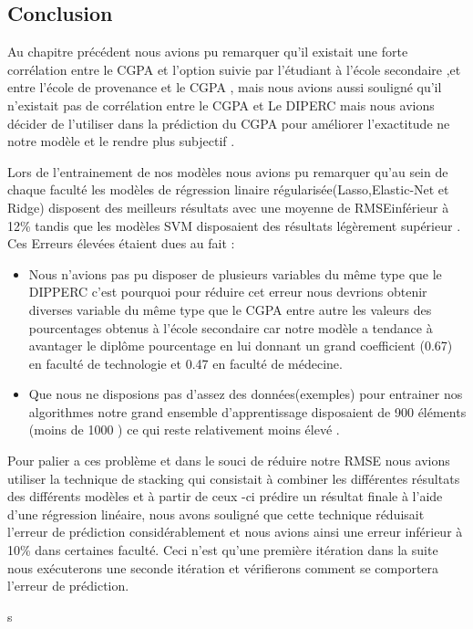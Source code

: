 \subsection{Conclusion}
Au chapitre précédent nous avions pu remarquer qu'il existait une forte corrélation entre le CGPA et l'option suivie par l'étudiant à l'école secondaire ,et entre l'école de provenance et le CGPA , mais nous avions aussi souligné qu'il n'existait pas de corrélation entre le CGPA et Le DIPERC mais nous avions décider de l'utiliser dans la prédiction du CGPA pour améliorer l'exactitude ne notre modèle et le rendre plus subjectif  .

Lors de l'entrainement de nos modèles nous avions pu remarquer qu'au sein de chaque faculté les modèles de régression linaire régularisée(Lasso,Elastic-Net et Ridge) disposent des meilleurs résultats avec une moyenne de \ac{RMSE}inférieur à 12\% tandis que les modèles SVM disposaient des résultats légèrement supérieur .
Ces Erreurs élevées étaient dues au fait :

\begin{itemize}
	\item Nous n'avions pas pu disposer de plusieurs variables du même type que le DIPPERC  c'est pourquoi pour réduire cet erreur nous devrions obtenir diverses variable du même type que le CGPA entre autre les valeurs des pourcentages obtenus à l'école secondaire car notre modèle a tendance à avantager le diplôme pourcentage en lui donnant un grand coefficient (0.67) en faculté de technologie et 0.47 en faculté de médecine. 
	\item Que nous ne disposions pas d'assez des données(exemples) pour entrainer nos algorithmes notre grand ensemble d'apprentissage disposaient de 900 éléments (moins de 1000 ) ce qui reste relativement  moins élevé   .
\end{itemize}

Pour palier a ces problème et dans le souci de réduire notre \ac{RMSE} nous avions utiliser la technique de stacking qui consistait à combiner les différentes résultats des différents modèles et à partir de ceux -ci prédire un résultat finale à l'aide d'une régression linéaire, nous avons souligné que cette technique réduisait l'erreur de prédiction considérablement et nous avions ainsi une erreur inférieur à 10\% dans certaines faculté.
Ceci n'est qu'une première itération dans la suite nous exécuterons une seconde itération et vérifierons comment se comportera l'erreur de prédiction.   

s